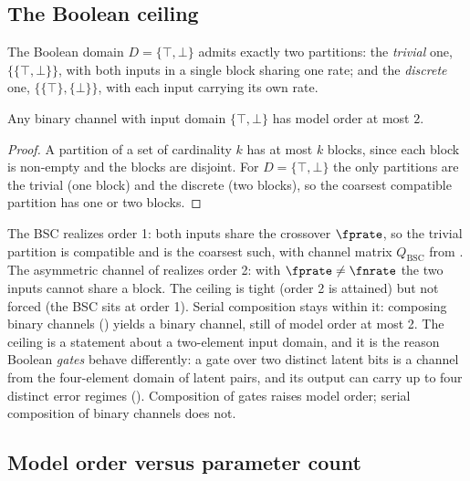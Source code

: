 \subsection*{The Boolean ceiling}

The Boolean domain $D = \{\top, \bot\}$ admits exactly two partitions: the
\emph{trivial} one, $\{\{\top, \bot\}\}$, with both inputs in a single block
sharing one rate; and the \emph{discrete} one, $\{\{\top\}, \{\bot\}\}$, with
each input carrying its own rate.

\begin{theorem}
\label{thm:boolean-ceiling}
Any binary channel with input domain $\{\top, \bot\}$ has model order at most
$2$.
\end{theorem}

\begin{proof}
A partition of a set of cardinality $k$ has at most $k$ blocks, since each block
is non-empty and the blocks are disjoint. For $D = \{\top, \bot\}$ the only
partitions are the trivial (one block) and the discrete (two blocks), so the
coarsest compatible partition has one or two blocks.
\end{proof}

The BSC realizes order 1: both inputs share the crossover $\fprate$, so the
trivial partition is compatible and is the coarsest such, with channel matrix
$Q_{\mathrm{BSC}}$ from . The asymmetric channel of
 realizes order 2: with $\fprate \neq \fnrate$ the
two inputs cannot share a block. The ceiling is tight (order 2 is attained) but
not forced (the BSC sits at order 1). Serial composition stays within it:
composing binary channels () yields a binary
channel, still of model order at most 2. The ceiling is a statement about a
two-element input domain, and it is the reason Boolean \emph{gates} behave
differently: a gate over two distinct latent bits is a channel from the
four-element domain of latent pairs, and its output can carry up to four
distinct error regimes (). Composition of gates
raises model order; serial composition of binary channels does not.

\subsection*{Model order versus parameter count}

